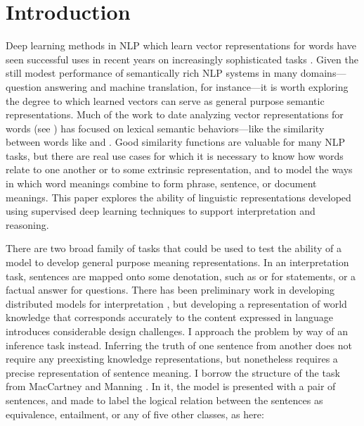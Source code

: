 \section{Introduction}

Deep learning methods in NLP which learn vector representations for words have seen successful uses in recent years on increasingly sophisticated tasks \cite{collobert2011natural, socher2011semi, socher2013acl1, chen2013learning}. Given the still modest performance of semantically rich NLP systems in many domains---question answering and machine translation, for instance---it is worth exploring the degree to which learned vectors can serve as general purpose semantic representations. 
Much of the work to date analyzing vector representations for words (see \cite{baroni2013frege}) has focused on lexical semantic behaviors---like the similarity between words like  and . Good similarity functions are valuable for many NLP tasks, but there are real use cases for which it is necessary to know how words relate to one another or to some extrinsic representation, and to model the ways in which word meanings combine to form phrase, sentence, or document meanings. This paper explores the ability of linguistic representations developed using supervised deep learning techniques to support interpretation and reasoning. 


There are two broad family of tasks that could be used to test the ability of a model to develop general purpose meaning representations. In an interpretation task, sentences are mapped onto some denotation, such as   or  for statements, or a factual answer for questions. There has been preliminary work in developing distributed models for interpretation \cite{grefenstette2013towards, rocktaschellow}, but developing a representation of world knowledge that corresponds accurately to the content expressed in language introduces considerable design challenges. I approach the problem by way of an inference task instead. Inferring the truth of one sentence from another does not require any preexisting knowledge representations, but nonetheless requires a precise representation of sentence meaning. I borrow the structure of the task from MacCartney and Manning  \cite{maccartney2009extended}. In it, the model is presented with a pair of sentences, and made to label the logical relation between the sentences as equivalence, entailment, or any of five other classes, as here:

